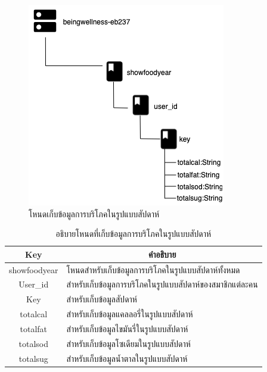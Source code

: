 \newpage
\begin{figure}[H]
	\centering
	\includegraphics[width=0.6\columnwidth]
	{Figures/3/DB/showfoodyear.png}
	\caption{โหนดเก็บข้อมูลการบริโภคในรูปแบบสัปดาห์}
	\label{Fig:DB4}
\end{figure}
\begin{table}[H]
	\centering
	\caption{อธิบายโหนดที่เก็บข้อมูลการบริโภคในรูปแบบสัปดาห์}
	\label{my-label1}
	\begin{tabular}{|c|p{10cm}|}
		\hline
		\multicolumn{1}{|c|}{\textbf{Key}} & \multicolumn{1}{c|}{\textbf{คำอธิบาย}} \\ \hline
		showfoodyear & โหนดสำหรับเก็บข้อมูลการบริโภคในรูปแบบสัปดาห์ทั้งหมด\\ \hline
		User\_id &  สำหรับเก็บข้อมูลการบริโภคในรูปแบบสัปดาห์ของสมาชิกแต่ละคน \\ \hline
		Key & สำหรับเก็บข้อมูลสัปดาห์\\ \hline
		totalcal & สำหรับเก็บข้อมูลแคลลอรี่ในรูปแบบสัปดาห์ \\ \hline
		totalfat & สำหรับเก็บข้อมูลไขมันรี่ในรูปแบบสัปดาห์ \\ \hline
		totalsod & สำหรับเก็บข้อมูลโซเดียมในรูปแบบสัปดาห์\\ \hline
		totalsug & สำหรับเก็บข้อมูลน้ำตาลในรูปแบบสัปดาห์\\ \hline
	\end{tabular}
\end{table}

